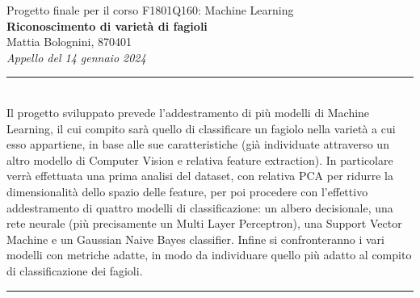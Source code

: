 \documentclass[a4paper,12pt]{article}
\renewenvironment{abstract}
 {\par\noindent\textbf{\abstractname}\ \ignorespaces \\}
 {\par\noindent\medskip}
\begin{document}
\pagestyle{fancy}
\thispagestyle{empty}
\fancyhead[L]{}
\renewcommand*{\thefootnote}{\fnsymbol{footnote}}
\begin{center}
\normalsize
Progetto finale per il corso F1801Q160: Machine Learning \\
\vspace{0.4cm}
\Large{\textbf{Riconoscimento di varietà di fagioli}}
\vspace{0.4cm}
\normalsize
\\ Mattia Bolognini, 870401 \\
\vspace{0.1cm}
\textit{Appello del 14 gennaio 2024}
\medskip
\normalsize
\end{center}
{\color{gray}\hrule}
\vspace{0.4cm}
\begin{abstract}
    Il progetto sviluppato prevede l'addestramento di più modelli di Machine
    Learning, il cui compito sarà quello di classificare un fagiolo nella 
    varietà a cui esso appartiene, in base alle sue caratteristiche (già
    individuate attraverso un altro modello di Computer Vision e relativa
    feature extraction).
    In particolare verrà effettuata una prima analisi del dataset, con relativa
    PCA per ridurre la dimensionalità dello spazio delle feature, per poi
    procedere con l'effettivo addestramento di quattro modelli di 
    classificazione: un albero decisionale, una rete neurale 
    (più precisamente un Multi Layer Perceptron), una Support Vector Machine e
    un Gaussian Naive Bayes classifier.
    Infine si confronteranno i vari modelli con metriche adatte, in modo da
    individuare quello più adatto al compito di classificazione dei fagioli.
\end{abstract}
{\color{gray}\hrule}
\medskip

\begin{multicols}{2}
    \tableofcontents

    
    
    
    
    

    \printbibliography
\end{multicols}
\end{document}
